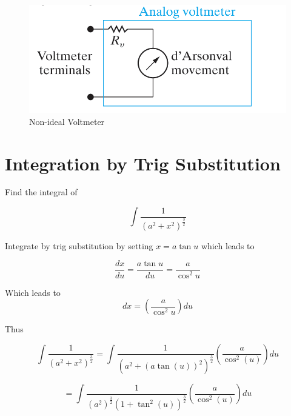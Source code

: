 \documentclass[14pt]{memoir}
\begin{document}
\begin{figure}[H]
\begin{center}
\includegraphics[scale=0.50]{fig/fig03_27.png}
\caption{Non-ideal Voltmeter}
\label{fig:fig03_27}
\end{center}
\end{figure}



\appendix

\chapter{Integration by Trig Substitution}
\label{sec:trigsub}

Find the integral of 

\begin{equation}
\int \frac{1}{(a^2 + x^2)^{\frac{3}{2}}}
\end{equation}

Integrate by trig substitution by setting $x = a\tan{u}$ which leads to 

\begin{equation}
\frac{dx}{du} = \frac{a \tan{u}}{du} = \frac{a}{\cos^2{u}}
\end{equation}

Which leads to 
\begin{equation}
dx = ( \frac{a}{\cos^2{u}}) du 
\end{equation}

Thus

\begin{equation}
\int \frac{1}{(a^2 + x^2)^{\frac{3}{2}}} =  \int \frac{1}{(a^2 + (a\tan{(u)})^2)^{\frac{3}{2}}} ( \frac{a}{\cos^2{(u)}}) du
\end{equation}

\begin{equation}
=  \int \frac{1}{(a^2)^{\frac{3}{2}} (1 + \tan^2{(u)})^{\frac{3}{2}}} ( \frac{a}{\cos^2{(u)}}) du
\end{equation}
\end{document}
